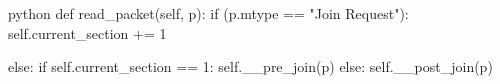 \begin{mintedbox}{python}
def read_packet(self, p):
    if (p.mtype == "Join Request"):
        self.current_section += 1

    else:
        if self.current_section == 1:
            self.__pre_join(p)
        else:
            self.__post_join(p)  
\end{mintedbox}